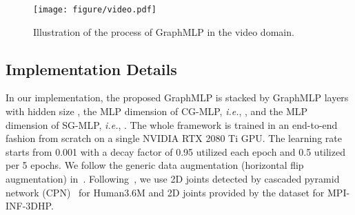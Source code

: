 \documentclass[lettersize,journal]{IEEEtran}
\begin{document}
\begin{figure}[tb]
\centering
\texttt{[image: figure/video.pdf]}
\caption
{
  Illustration of the process of GraphMLP in the video domain. 
}
\label{fig:video}
\end{figure}

\subsection{Implementation Details}
In our implementation, the proposed GraphMLP is stacked by  GraphMLP layers with hidden size , the MLP dimension of CG-MLP, \textit{i.e.}, , and the MLP dimension of SG-MLP, \textit{i.e.}, . 
The whole framework is trained in an end-to-end fashion from scratch on a single NVIDIA RTX 2080 Ti GPU. 
The learning rate starts from 0.001 with a decay factor of 0.95 utilized each epoch and 0.5 utilized per 5 epochs. 
We follow the generic data augmentation (horizontal flip augmentation) in~\cite{videopose,stgcn,zou2021modulated}. 
Following~\cite{xu2021graph,zou2021modulated,zeng2021learning}, we use 2D joints detected by cascaded pyramid network (CPN)~\cite{chen2018cascaded} for Human3.6M and 2D joints provided by the dataset for MPI-INF-3DHP. 
\end{document}
